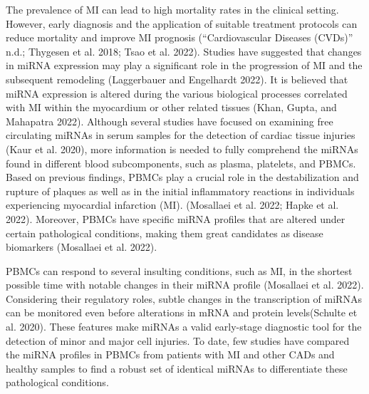 \documentclass[smallextended]{svjour3}       %
\begin{document}
The prevalence of MI can lead to high mortality rates in the clinical
setting. However, early diagnosis and the application of suitable
treatment protocols can reduce mortality and improve MI prognosis
({``Cardiovascular Diseases ({CVDs})''} n.d.; Thygesen et al. 2018; Tsao
et al. 2022). Studies have suggested that changes in miRNA expression
may play a significant role in the progression of MI and the subsequent
remodeling (Laggerbauer and Engelhardt 2022). It is believed that miRNA
expression is altered during the various biological processes correlated
with MI within the myocardium or other related tissues (Khan, Gupta, and
Mahapatra 2022). Although several studies have focused on examining free
circulating miRNAs in serum samples for the detection of cardiac tissue
injuries (Kaur et al. 2020), more information is needed to fully
comprehend the miRNAs found in different blood subcomponents, such as
plasma, platelets, and PBMCs. Based on previous findings, PBMCs play a
crucial role in the destabilization and rupture of plaques as well as in
the initial inflammatory reactions in individuals experiencing
myocardial infarction (MI). (Mosallaei et al. 2022; Hapke et al. 2022).
Moreover, PBMCs have specific miRNA profiles that are altered under
certain pathological conditions, making them great candidates as disease
biomarkers (Mosallaei et al. 2022).

PBMCs can respond to several insulting conditions, such as MI, in the
shortest possible time with notable changes in their miRNA profile
(Mosallaei et al. 2022). Considering their regulatory roles, subtle
changes in the transcription of miRNAs can be monitored even before
alterations in mRNA and protein levels(Schulte et al. 2020). These
features make miRNAs a valid early-stage diagnostic tool for the
detection of minor and major cell injuries. To date, few studies have
compared the miRNA profiles in PBMCs from patients with MI and other
CADs and healthy samples to find a robust set of identical miRNAs to
differentiate these pathological conditions.
\end{document}
